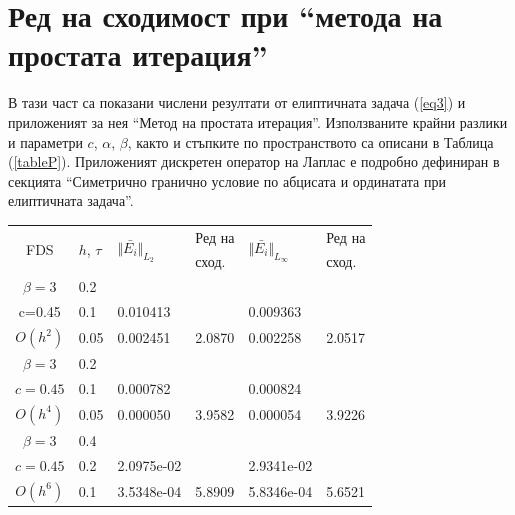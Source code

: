 \documentclass{article}
\newcommand{\rf}[1]{(\ref{#1})}
\begin{document}
\section{Ред на сходимост при ``метода на простата итерация''}\label{validation}
В тази част са показани числени резултати от елиптичната задача \rf{eq3} и приложеният за нея ``Метод на простата итерация''. Използваните крайни разлики и параметри $c$, $\alpha$, $\beta$, както и стъпките по пространството са описани в Таблица \rf{tableP}. Приложеният дискретен оператор на Лаплас е подробно дефиниран в секцията ``Симетрично гранично условие по абцисата и ординатата при елиптичната задача''.

\begin{table}[ht]
\centering
		\begin{tabular}{||c|l|ll|ll||}
			\hline
			\hline
      \multirow{2  }{*}{FDS}        & \multirow{2  }{*}{$h$, $\tau$}  &  	\multirow{2  }{*}{ $\Vert \bar{ E_i} \Vert_{L_2}$ }	&Ред на	& \multirow{2  }{*}{ $\Vert \bar{ E_i} \Vert_{L_\infty}$ } 		&Ред на   \\
	                                        &                                                & 							 					&  сход. 	& 								       					& сход. \\
   					\hline 
					\hline 
$\beta = 3$   	&0.2    										&            &            &           &   \\
      c=0.45 	&0.1    & 0.010413  						&            & 0.009363 			&   \\
   $O(h^2)$     &0.05   & 0.002451  						&2.0870  & 0.002258 					& 2.0517 \\
\hline 
$\beta = 3$   	&0.2   &            &            &             &    \\
      $c=0.45 $ &0.1   &  0.000782   &           & 0.000824  &   \\
       $O(h^4)$	&0.05  &  0.000050 & 3.9582    & 0.000054  & 3.9226  \\
\hline
$\beta = 3$   	&0.4   &            &        &                  &      \\
   $c=0.45$   	&0.2   &  2.0975e-02 &           & 2.9341e-02      &       \\
     $O(h^6)$	&0.1  &  3.5348e-04 &5.8909  & 5.8346e-04 & 5.6521         \\


\end{tabular}
\end{table}
\end{document}

